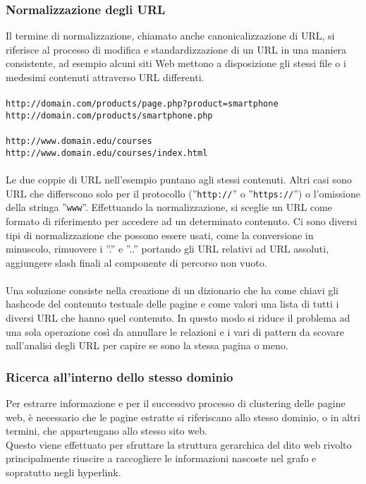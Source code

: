 \subsubsection{Normalizzazione degli URL}
Il termine di normalizzazione, chiamato anche canonicalizzazione di URL, si riferisce al processo di modifica e standardizzazione di un URL in una maniera consistente, ad esempio alcuni siti Web mettono a disposizione gli stessi file o i medesimi contenuti attraverso URL differenti. 
\\\\
\texttt{http://domain.com/products/page.php?product=smartphone}
\\
\texttt{http://domain.com/products/smartphone.php}
\\\\
\texttt{http://www.domain.edu/courses}
\\
\texttt{http://www.domain.edu/courses/index.html}
\\\\
Le due coppie di URL nell’esempio puntano agli stessi contenuti. Altri casi sono URL che differscono solo per il protocollo (''\texttt{http://}'' o ''\texttt{https://}'') o l'omissione della stringa ''\texttt{www}''. Effettuando la normalizzazione, si sceglie un URL come formato di riferimento per accedere ad un determinato contenuto. Ci sono diversi tipi di normalizzazione che possono essere usati, come la conversione in minuscolo, rimuovere i ''.'' e ''..'' portando gli URL relativi ad URL assoluti, aggiungere slash finali al componente di percorso non vuoto.
\\\\
Una soluzione consiste nella creazione di un dizionario che ha come chiavi gli hashcode del contenuto testuale delle pagine e come valori una lista di tutti i diversi URL che hanno quel contenuto. In questo modo si riduce il problema ad una sola operazione così da annullare le relazioni e i vari di pattern da scovare nall'analisi degli URL per capire se sono la stessa pagina o meno. 

\subsubsection{Ricerca all'interno dello stesso dominio}
Per estrarre informazione e per il successivo processo di clustering delle pagine web, è necessario che le pagine estratte si riferiscano allo stesso dominio, o in altri termini, che appartengano allo stesso sito web.
\\
Questo viene effettuato per sfruttare la struttura gerarchica del dito web rivolto principalmente riuscire a  raccogliere le informazioni nascoste nel grafo e sopratutto negli hyperlink.

